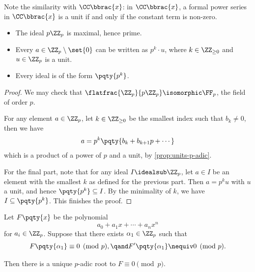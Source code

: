 Note the similarity with \(\CC\bbrac{x}\): in \(\CC\bbrac{x}\), a formal power series in \(\CC\bbrac{x}\) is a unit if and only if the constant term is non-zero.

\begin{proposition}
    \label{prop:ideals-p-adic}%
    \begin{itemize}
        \item The ideal \(p \ZZ_p\) is maximal, hence prime.
        \item Every \(a \in \ZZ_p \setminus \set{0}\) can be written as \(p^k \cdot u\), where \(k \in \ZZ_{\geq 0}\) and \(u \in \ZZ_p\) is a unit.
        \item Every ideal is of the form \(\pqty{p^k}\).
    \end{itemize}
\end{proposition}

\begin{proof}
    We may check that \(\flatfrac{\ZZ_p}{p \ZZ_p} \isomorphic \FF_p\), the field of order \(p\).
    
    For any element \(a \in \ZZ_p\), let \(k \in \ZZ_{\geq 0}\) be the smallest index such that \(b_k \neq 0\), then we have
    \[
        a = p^k \pqty{b_k + b_{k + 1} p + \cdots}
    \]
    which is a product of a power of \(p\) and a unit, by \autoref{prop:units-p-adic}.

    For the final part, note that for any ideal \(I \idealsub \ZZ_p\), let \(a \in I\) be an element with the smallest \(k\) as defined for the previous part. Then \(a = p^k u\) with \(u\) a unit, and hence \(\pqty{p^k} \subseteq I\). By the minimality of \(k\), we have \(I \subseteq \pqty{p^k}\). This finishes the proof.
\end{proof}

\begin{theorem}
    \label{thm:hensel-lemma}%
    Let \(F\pqty{x}\) be the polynomial
    \[
        a_0 + a_1 x + \cdots + a_n x^n
    \]
    for \(a_i \in \ZZ_p\). Suppose that there exists \(\alpha_1 \in \ZZ_p\) such that
    \[
        F\pqty{\alpha_1} \equiv 0 \pmod{p}, \qand F'\pqty{\alpha_1} \nequiv 0 \pmod{p}.
    \]

    Then there is a unique \(p\)-adic root to \(F \equiv 0 \pmod{p}\).
\end{theorem}

